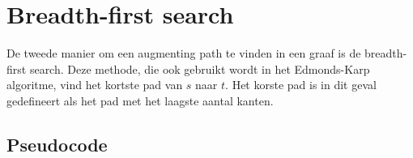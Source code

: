\chapter{Breadth-first search}
\label{chap:breadthfirst}

De tweede manier om een augmenting path te vinden in een graaf is de breadth-first search. Deze methode, die ook gebruikt wordt in het Edmonds-Karp algoritme, vind het kortste pad van $s$ naar $t$. Het korste pad is in dit geval gedefineert als het pad met het laagste aantal kanten.

\section{Pseudocode}